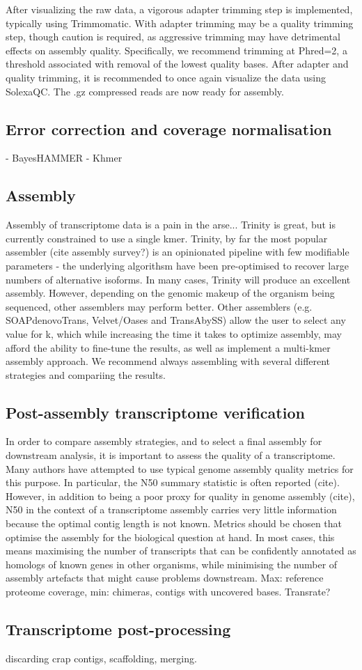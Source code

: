 After visualizing the raw data, a vigorous adapter trimming step is implemented, typically using Trimmomatic. With adapter trimming may be a quality trimming step, though caution is required, as aggressive trimming may have detrimental effects on assembly quality. Specifically, we recommend trimming at Phred=2, a threshold associated with removal of the lowest quality bases. After adapter and quality trimming, it is recommended to once again visualize the data using SolexaQC. The .gz compressed reads are now ready for assembly. \\

\subsection{Error correction and coverage normalisation}
- BayesHAMMER
- Khmer

\subsection{Assembly}
Assembly of transcriptome data is a pain in the arse... Trinity is great, but is currently constrained to use a single kmer. Trinity, by far the most popular assembler (cite assembly survey?) is an opinionated pipeline with few modifiable parameters - the underlying algorithsm have been pre-optimised to recover large numbers of alternative isoforms. In many cases, Trinity will produce an excellent assembly. However, depending on the genomic makeup of the organism being sequenced, other assemblers may perform better. Other assemblers (e.g. SOAPdenovoTrans, Velvet/Oases and TransAbySS) allow the user to select any value for k, which while increasing the time it takes to optimize assembly, may afford the ability to fine-tune the results, as well as implement a multi-kmer assembly approach. We recommend always assembling with several different strategies and compariing the results. \\

\subsection{Post-assembly transcriptome verification}
In order to compare assembly strategies, and to select a final assembly for downstream analysis, it is important to assess the quality of a transcriptome. Many authors have attempted to use typical genome assembly quality metrics for this purpose. In particular, the N50 summary statistic is often reported (cite). However, in addition to being a poor proxy for quality in genome assembly (cite), N50 in the context of a transcriptome assembly carries very little information because the optimal contig length is not known. Metrics should be chosen that optimise the assembly for the biological question at hand. In most cases, this means maximising the number of transcripts that can be confidently annotated as homologs of known genes in other organisms, while minimising the number of assembly artefacts that might cause problems downstream. Max: reference proteome coverage, min: chimeras, contigs with uncovered bases. Transrate?

\subsection{Transcriptome post-processing}
discarding crap contigs, scaffolding, merging.
